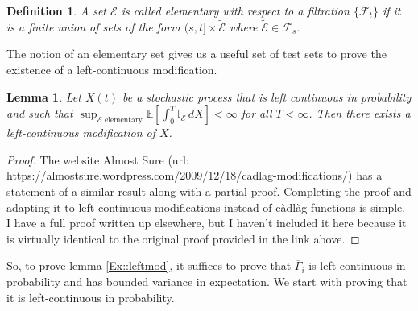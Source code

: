 \documentclass[12pt]{article}
\newcommand{\mb}{\mathbb}
\newcommand{\mc}{\mathcal}
\newcommand{\ov}{\overline}
\newcommand{\te}{\text}
\newcommand{\ex}[1]{\mb{E}\left[#1\right]}			%
\newcommand{\Xf}{X}									%
\newcommand{\F}{\mc{F}}								%
\newcommand{\tme}[1]{(#1)}							%
\newcommand{\stpara}[1]{_{#1}}						%
\newcommand{\tpara}[1]{_{#1}}						%
\newcommand{\evnt}{\mc{E}}						%
\newcommand{\alt}[1]{\tilde{#1}}					%
\newcommand{\ratee}{\Gamma}							%
\newcommand{\grate}{\ov{\ratee}}					%
\newtheorem{lem}[thms]{Lemma}
\newtheorem{defn}[thms]{Definition}
\begin{document}
\begin{defn}
A set \(\evnt\) is called elementary with respect to a filtration \(\{\F\tpara{t}\}\) if it is a finite union of sets of the form \((s,t]\times \alt{\evnt}\) where \(\alt{\evnt} \in \F\tpara{s}\).
\label{Ex::elementary}
\end{defn}

The notion of an elementary set gives us a useful set of test sets to prove the existence of a left-continuous modification. 

\begin{lem}
Let \(\Xf\tme{t}\) be a stochastic process that is left continuous in probability and such that \(\sup_{\evnt\te{ elementary}}\ex{\int_0^T \mb{I}_\evnt\,d\Xf} < \infty\) for all \(T < \infty\). Then there exists a left-continuous modification of \(\Xf\).
\label{Ex::leftmodgen}
\end{lem}
\begin{proof}
The website Almost Sure (url: https://almostsure.wordpress.com/2009/12/18/cadlag-modifications/) has a statement of a similar result along with a partial proof. Completing the proof and adapting it to left-continuous modifications instead of c\`adl\`ag functions is simple. I have a full proof written up elsewhere, but I haven't included it here because it is virtually identical to the original proof provided in the link above.
\end{proof}

So, to prove lemma \ref{Ex::leftmod}, it suffices to prove that \(\grate\stpara{i}\) is left-continuous in probability and has bounded variance in expectation. We start with proving that it is left-continuous in probability.
\end{document}
